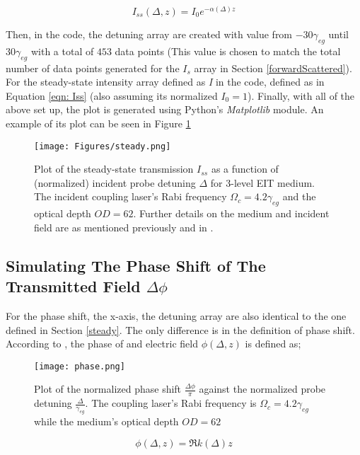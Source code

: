 \begin{equation}
    I_{ss}(\Delta, z) = I_{0} e^{-\alpha(\Delta) z}
    \label{eqn: Iss}
\end{equation}

\newpage

Then, in the code, the detuning array are created with value from $-30\gamma_{eg}$ until $30\gamma_{eg}$ with a total of $453$ data points (This value is chosen to match the total number of data points generated for the $I_{s}$ array in Section \ref{forwardScattered}). For the steady-state intensity array defined as \textit{I} in the code, defined as in Equation \ref{eqn: Iss} (also assuming its normalized $I_{0} = 1$). Finally, with all of the above set up, the plot is generated using Python's \textit{Matplotlib} module. An example of its plot can be seen in Figure \ref{fig: steady}

\begin{figure}[h!]
    \centering
    \texttt{[image: Figures/steady.png]}
    \caption{Plot of the steady-state transmission $I_{ss}$ as a function of (normalized) incident probe detuning $\Delta$ for 3-level EIT medium. The incident coupling laser's Rabi frequency $\Omega_{c} = 4.2\gamma_{eg}$ and the optical depth $OD = 62$. Further details on the medium and incident field are as mentioned previously and in \cite{jeong2010slow}.}
    \label{fig: steady}
\end{figure}

\subsection{Simulating The Phase Shift of The Transmitted Field $\Delta\phi$}
For the phase shift, the x-axis, the detuning array are also identical to the one defined in Section \ref{steady}. The only difference is in the definition of phase shift. According to \cite{boyd2020nonlinear}, the phase of and electric field $\phi(\Delta, z)$ is defined as;

\begin{figure}[h!]
    \centering
    \texttt{[image: phase.png]}
    \caption{Plot of the normalized phase shift $\frac{\Delta\phi}{\pi}$ against the normalized probe detuning $\frac{\Delta}{\gamma_{eg}}$. The coupling laser's Rabi frequency is $\Omega_{c} = 4.2\gamma_{eg}$ while the medium's optical depth $OD = 62$}
    \label{fig: phase}
\end{figure}

\begin{equation}
    \phi(\Delta, z) = \Re{k(\Delta)} z
    \label{eqn: phase}
\end{equation}


